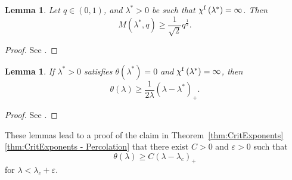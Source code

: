 \documentclass[10pt,a4paper,dvipsnames]{article}
\newtheorem{lemma}[theorem]{Lemma}
\theoremstyle{definition}
\theoremstyle{remark}
\numberwithin{equation}{section}
\begin{document}
\begin{lemma}
\label{lem:magnetlowerbound}
    Let $q\in\left(0,1\right)$, and $\lambda^*>0$ be such that $\chi^{\rm f}\left(\lambda^*\right)=\infty$. Then
    \begin{equation}
        M\left(\lambda^*,q\right)\geq \frac{1}{\sqrt{2}}q^{\frac{1}{2}}.
    \end{equation}
\end{lemma}

\begin{proof}
    See \cite[Corollary~3.8]{caicedo2023critical}.
\end{proof}

\begin{lemma}
\label{lem:protoPercolationLowerbound}
    If $\lambda^*>0$ satisfies $\theta(\lambda^*)=0$ and $\chi^{\rm f}\left(\lambda^*\right)=\infty$, then
    \begin{equation}
        \theta(\lambda) \geq \frac{1}{2\lambda}\left(\lambda-\lambda^*\right)_+.
    \end{equation}
\end{lemma}

\begin{proof}
    See \cite[Proposition~4.3]{caicedo2023critical}.
\end{proof}

These lemmas lead to a proof of the claim in Theorem~\ref{thm:CritExponents}\ref{thm:CritExponents - Percolation} that there exist $C>0$ and $\varepsilon>0$ such that
\begin{equation}
    \theta\left(\lambda\right) \geq C\left(\lambda-\lambda_c\right)_+
\end{equation}
for $\lambda<\lambda_c+\varepsilon$.
\end{document}
